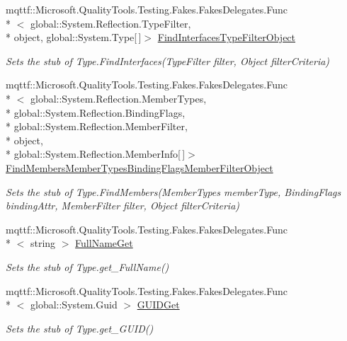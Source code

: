 \begin{DoxyCompactItemize}
mqttf\-::\-Microsoft.\-Quality\-Tools.\-Testing.\-Fakes.\-Fakes\-Delegates.\-Func\\*
$<$ global\-::\-System.\-Reflection.\-Type\-Filter, \\*
object, global\-::\-System.\-Type\mbox{[}$\,$\mbox{]}$>$ \hyperlink{class_system_1_1_fakes_1_1_stub_type_aa2c1ab3f58d06b6c9092b6918ceac35b}{Find\-Interfaces\-Type\-Filter\-Object}
\begin{DoxyCompactList}\small\item\em Sets the stub of Type.\-Find\-Interfaces(\-Type\-Filter filter, Object filter\-Criteria)\end{DoxyCompactList}\item 
mqttf\-::\-Microsoft.\-Quality\-Tools.\-Testing.\-Fakes.\-Fakes\-Delegates.\-Func\\*
$<$ global\-::\-System.\-Reflection.\-Member\-Types, \\*
global\-::\-System.\-Reflection.\-Binding\-Flags, \\*
global\-::\-System.\-Reflection.\-Member\-Filter, \\*
object, \\*
global\-::\-System.\-Reflection.\-Member\-Info\mbox{[}$\,$\mbox{]}$>$ \hyperlink{class_system_1_1_fakes_1_1_stub_type_a2b494818cc4e5b3178621d5f487521d8}{Find\-Members\-Member\-Types\-Binding\-Flags\-Member\-Filter\-Object}
\begin{DoxyCompactList}\small\item\em Sets the stub of Type.\-Find\-Members(\-Member\-Types member\-Type, Binding\-Flags binding\-Attr, Member\-Filter filter, Object filter\-Criteria)\end{DoxyCompactList}\item 
mqttf\-::\-Microsoft.\-Quality\-Tools.\-Testing.\-Fakes.\-Fakes\-Delegates.\-Func\\*
$<$ string $>$ \hyperlink{class_system_1_1_fakes_1_1_stub_type_a20fadc18280ce1e362d6c4babce42889}{Full\-Name\-Get}
\begin{DoxyCompactList}\small\item\em Sets the stub of Type.\-get\-\_\-\-Full\-Name()\end{DoxyCompactList}\item 
mqttf\-::\-Microsoft.\-Quality\-Tools.\-Testing.\-Fakes.\-Fakes\-Delegates.\-Func\\*
$<$ global\-::\-System.\-Guid $>$ \hyperlink{class_system_1_1_fakes_1_1_stub_type_a39a40160e10c295daf159341014cd533}{G\-U\-I\-D\-Get}
\begin{DoxyCompactList}\small\item\em Sets the stub of Type.\-get\-\_\-\-G\-U\-I\-D()\end{DoxyCompactList}\item 

\end{DoxyCompactItemize}
